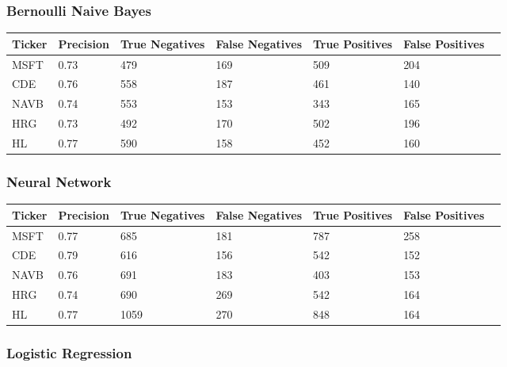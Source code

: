 \subsubsection{Bernoulli Naive Bayes}

\begin{center}
    \begin{tabular}{ | l | l | l | | l | l | l | p{5cm} |}
    \hline
    Ticker & Precision & True Negatives & False Negatives & True Positives & False Positives \\ \hline
    MSFT & 0.73 & 479 & 169 & 509 & 204 \\ \hline
    CDE & 0.76 & 558 & 187 & 461 & 140 \\ \hline
    NAVB & 0.74 & 553 & 153 & 343 & 165 \\ \hline
    HRG & 0.73 & 492 & 170 & 502 & 196 \\ \hline
    HL & 0.77 & 590 & 158 & 452 & 160 \\
    \hline
    \end{tabular}
\end{center}

\subsubsection{Neural Network}

\begin{center}
    \begin{tabular}{ | l | l | l | | l | l | l | p{5cm} |}
    \hline
    Ticker & Precision & True Negatives & False Negatives & True Positives & False Positives \\ \hline
    MSFT & 0.77 & 685 & 181 & 787 & 258 \\ \hline
    CDE & 0.79 & 616 & 156 & 542 & 152 \\ \hline
    NAVB & 0.76 & 691 & 183 & 403 & 153 \\ \hline
    HRG & 0.74 & 690 & 269 & 542 & 164 \\ \hline
    HL & 0.77 & 1059 & 270 & 848 & 164 \\
    \hline
    \end{tabular}
\end{center}

\subsubsection{Logistic Regression}

